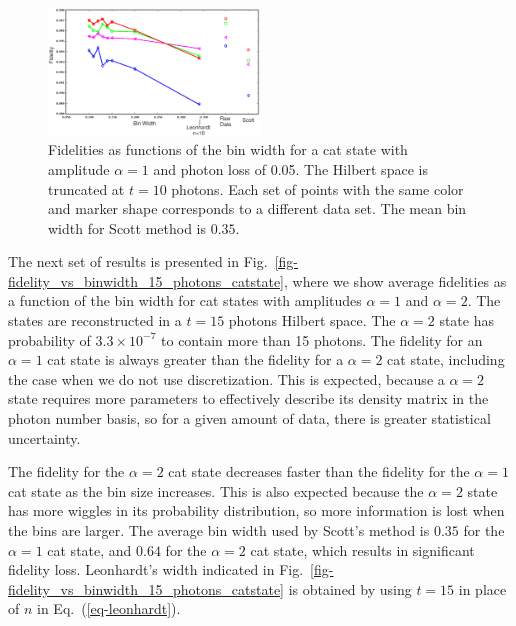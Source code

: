 \documentclass[
reprint,
superscriptaddress,
showpacs,
amsmath,
amssymb,
aps,
pra,
longbibliography
]{revtex4-1}
\begin{document}
\begin{figure}
  \includegraphics[width=0.5\textwidth]{methods_fidelity_singledata.eps}
  \caption{Fidelities as functions of the bin width for
    a cat state with amplitude $\alpha=1$ and photon loss of
    0.05. The Hilbert space is truncated at $t=10$ photons. Each set
    of points with the same color and marker shape corresponds to a
    different data set. The mean bin width for Scott method is
    $0.35$.}
  \label{fig-methods_fidelity_singledata}
\end{figure}



The next set of results is presented in
Fig.~\ref{fig-fidelity_vs_binwidth_15_photons_catstate}, where we show
average fidelities as a function of the bin width for cat states with
amplitudes $\alpha=1$ and $\alpha=2$. The states are reconstructed in
a $t=15$ photons Hilbert space. The $\alpha=2$ state has
  probability of $3.3 \times 10^{-7}$ to contain more than 15 photons. 
  The fidelity for an $\alpha=1$ cat state is always greater than the fidelity 
  for a $\alpha=2$ cat state, including the case when we do not use
discretization. This is expected, because a $\alpha = 2$ state
requires more parameters to effectively describe its density matrix in
the photon number basis, so for a given amount of data, there is
greater statistical uncertainty.

The fidelity for the $\alpha = 2$ cat state decreases faster than the
fidelity for the $\alpha=1$ cat state as the bin size increases. This
is also expected because the $\alpha = 2$ state has more wiggles in
its probability distribution, so more information is lost when the
bins are larger. The average bin width used by Scott's method is
$0.35$ for the $\alpha=1$ cat state, and $0.64$ for the $\alpha=2$ cat
state, which results in significant fidelity loss. Leonhardt's width indicated 
in Fig.~\ref{fig-fidelity_vs_binwidth_15_photons_catstate} is obtained by
using $t=15$ in place of $n$ in Eq.~(\ref{eq-leonhardt}).
\end{document}
